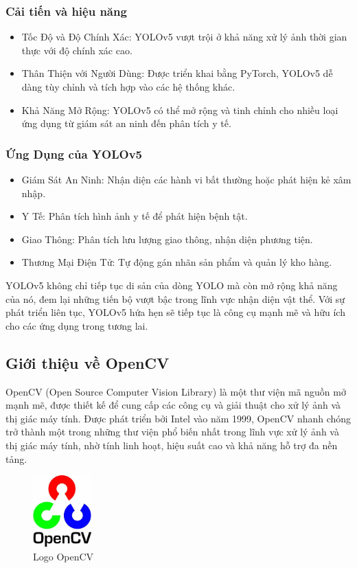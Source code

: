 \begin{flushleft}
\begin{itemize}
    \end{itemize}
    \fontsize{13}{20}\selectfont\subsubsection{Cải tiến và hiệu năng}
    \begin{itemize}
        \item Tốc Độ và Độ Chính Xác: YOLOv5 vượt trội ở khả năng xử lý ảnh thời gian thực với độ chính xác cao.
        \item Thân Thiện với Người Dùng: Được triển khai bằng PyTorch, YOLOv5 dễ dàng tùy chỉnh và tích hợp vào các hệ thống khác.
        \item Khả Năng Mở Rộng: YOLOv5 có thể mở rộng và tinh chỉnh cho nhiều loại ứng dụng từ giám sát an ninh đến phân tích y tế.
    \end{itemize}
    \subsubsection{Ứng Dụng của YOLOv5}
    \begin{itemize}
        \item Giám Sát An Ninh: Nhận diện các hành vi bất thường hoặc phát hiện kẻ xâm nhập.
        \item Y Tế: Phân tích hình ảnh y tế để phát hiện bệnh tật.
        \item Giao Thông: Phân tích lưu lượng giao thông, nhận diện phương tiện.
        \item Thương Mại Điện Tử: Tự động gán nhãn sản phẩm và quản lý kho hàng.
    \end{itemize}
    YOLOv5 không chỉ tiếp tục di sản của dòng YOLO mà còn mở rộng khả năng của nó, đem lại những tiến bộ vượt bậc trong lĩnh vực nhận diện vật thể. Với sự phát triển liên tục, YOLOv5 hứa hẹn sẽ tiếp tục là công cụ mạnh mẽ và hữu ích cho các ứng dụng trong tương lai.
    \subsection{Giới thiệu về OpenCV}
    OpenCV (Open Source Computer Vision Library) là một thư viện mã nguồn mở mạnh mẽ, được thiết kế để cung cấp các công cụ và giải thuật cho xử lý ảnh và thị giác máy tính. Được phát triển bởi Intel vào năm 1999, OpenCV nhanh chóng trở thành một trong những thư viện phổ biến nhất trong lĩnh vực xử lý ảnh và thị giác máy tính, nhờ tính linh hoạt, hiệu suất cao và khả năng hỗ trợ đa nền tảng.\\
    \begin{figure}[h]
        \centering
        \includegraphics[width=0.2\textwidth]{images/OIP.jpg}
        \caption{Logo OpenCV}\label{fig:logo_cv2}
    \end{figure}

\end{flushleft}
